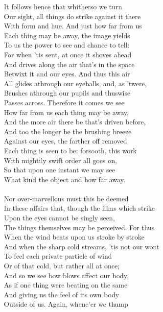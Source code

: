 It follows hence that whitherso we turn\\
Our sight, all things do strike against it there\\
With form and hue. And just how far from us\\
Each thing may be away, the image yields\\
To us the power to see and chance to tell:\\
For when 'tis sent, at once it shoves ahead\\
And drives along the air that's in the space\\
Betwixt it and our eyes. And thus this air\\
All glides athrough our eyeballs, and, as 'twere,\\
Brushes athrough our pupils and thuswise\\
Passes across. Therefore it comes we see\\
How far from us each thing may be away,\\
And the more air there be that's driven before,\\
And too the longer be the brushing breeze\\
Against our eyes, the farther off removed\\
Each thing is seen to be: forsooth, this work\\
With mightily swift order all goes on,\\
So that upon one instant we may see\\
What kind the object and how far away.\\
\\
Nor over-marvellous must this be deemed\\
In these affairs that, though the films which strike\\
Upon the eyes cannot be singly seen,\\
The things themselves may be perceived. For thus\\
When the wind beats upon us stroke by stroke\\
And when the sharp cold streams, 'tis not our wont\\
To feel each private particle of wind\\
Or of that cold, but rather all at once;\\
And so we see how blows affect our body,\\
As if one thing were beating on the same\\
And giving us the feel of its own body\\
Outside of us. Again, whene'er we thump\\
